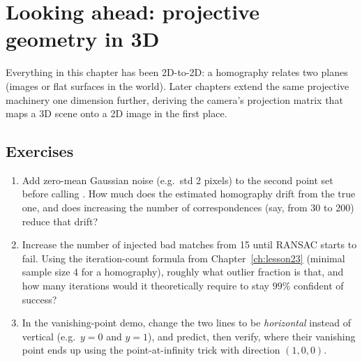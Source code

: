 \section{Looking ahead: projective geometry in 3D}

Everything in this chapter has been 2D-to-2D: a homography relates two planes (images or flat surfaces in the world). Later chapters extend the same projective machinery one dimension further, deriving the camera's projection matrix that maps a 3D scene onto a 2D image in the first place.

\subsection*{Exercises}
\begin{enumerate}
  \item Add zero-mean Gaussian noise (e.g.\ std 2 pixels) to the second point set before calling . How much does the estimated homography drift from the true one, and does increasing the number of correspondences (say, from 30 to 200) reduce that drift?
  \item Increase the number of injected bad matches from 15 until RANSAC starts to fail. Using the iteration-count formula from Chapter~\ref{ch:lesson23} (minimal sample size 4 for a homography), roughly what outlier fraction is that, and how many iterations would it theoretically require to stay $99\%$ confident of success?
  \item In the vanishing-point demo, change the two lines to be \emph{horizontal} instead of vertical (e.g.\ $y=0$ and $y=1$), and predict, then verify, where their vanishing point ends up using the point-at-infinity trick with direction $(1,0,0)$.
\end{enumerate}

\vfill
{}
